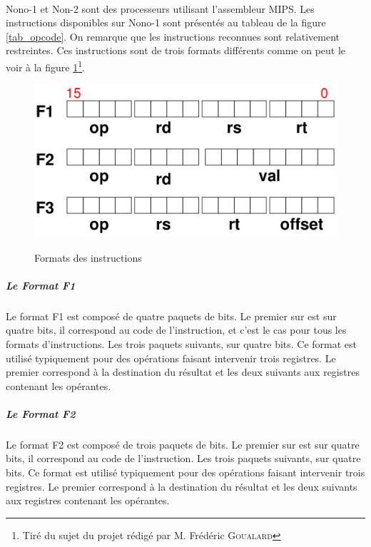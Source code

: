 \documentclass[a4paper]{article}
\begin{document}
			\paragraph{}{
			Nono-1 et Non-2 sont des processeurs utilisant l'assembleur MIPS. Les 
			instructions disponibles sur Nono-1 sont présentés au tableau de la figure
			\ref{tab_opcode}. On remarque que les instructions reconnues sont relativement
			restreintes. Ces instructions sont de trois formats différents comme on peut
			le voir à la figure \ref{format_inst}\footnote{Tiré du sujet du projet rédigé par M. Frédéric \textsc{Goualard}}.
			}
			
			\begin{figure}
			\centering
			\includegraphics[scale=0.2]{formats_instructions.png}
			\label{format_inst}
			\caption{Formats des instructions}
			\end{figure}
			
				\subparagraph{Le Format F1}{
				Le format F1 est composé de quatre paquets de bits.
				Le premier sur est sur quatre bits, il correspond au code de l'instruction,
				et c'est le cas pour tous les formats d'instructions.
				Les trois paquets suivants, sur quatre bits. Ce format est utilisé typiquement
				pour des opérations faisant intervenir trois registres. Le premier correspond
				à la destination du résultat et les deux suivants aux registres contenant les
				opérantes.
				}
				\subparagraph{Le Format F2}{
				Le format F2 est composé de trois paquets de bits.
				Le premier sur est sur quatre bits, il correspond au code de l'instruction.
				Les trois paquets suivants, sur quatre bits. Ce format est utilisé typiquement
				pour des opérations faisant intervenir trois registres. Le premier correspond
				à la destination du résultat et les deux suivants aux registres contenant les
				opérantes.
				}
			
\end{document}
